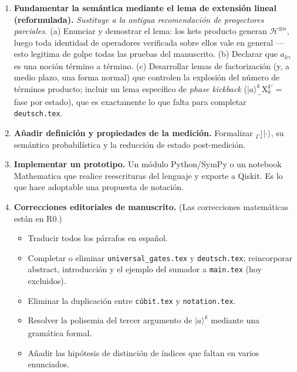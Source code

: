 \documentclass[12pt, a4paper]{article}
\newcommand{\gate}[1]{\text{#1}}
\newcommand{\stateket}[3]{\ket{#1}^{#2}_{#3}}
\newcommand{\stategate}[3]{\gate{#1}^{#2}_{#3}}
\newcommand{\ket}[1]{|#1\rangle}
\begin{document}
\begin{enumerate}[label=\textbf{R\arabic*.}, start=0]
  \item \textbf{Fundamentar la semántica mediante el lema de extensión
          lineal (reformulada).}
        \emph{Sustituye a la antigua recomendación de proyectores parciales.}
        (a) Enunciar y demostrar el lema: los kets producto generan
        $\mathcal{H}^{\otimes n}$, luego toda identidad de operadores
        verificada sobre ellos vale en general --- esto legitima de golpe
        todas las pruebas del manuscrito.
        (b) Declarar que $a_{k\gamma}$ es una noción término a término.
        (c) Desarrollar lemas de factorización (y, a medio plazo, una forma
        normal) que controlen la explosión del número de términos producto;
        incluir un lema específico de \emph{phase kickback}
        ($\stateket{a}{k}{-}\stategate{X}{k'}{k} = $ fase por estado), que es
        exactamente lo que falta para completar \texttt{deutsch.tex}.

  \item \textbf{Añadir definición y propiedades de la medición.}
        Formalizar $_{{\Gamma}}\rfloor\ket{\cdot}$, su semántica probabilística
        y la reducción de estado post-medición.

  \item \textbf{Implementar un prototipo.}
        Un módulo Python/SymPy o un notebook Mathematica que realice
        reescrituras del lenguaje y exporte a Qiskit. Es lo que hace adoptable
        una propuesta de notación.

  \item \textbf{Correcciones editoriales de manuscrito.}
        (Las correcciones matemáticas están en R0.)
        \begin{itemize}
          \item Traducir todos los párrafos en español.
          \item Completar o eliminar \texttt{universal\_gates.tex} y
                \texttt{deutsch.tex}; reincorporar abstract, introducción y
                el ejemplo del sumador a \texttt{main.tex} (hoy excluidos).
          \item Eliminar la duplicación entre \texttt{cúbit.tex} y
                \texttt{notation.tex}.
          \item Resolver la polisemia del tercer argumento de
                $\stateket{a}{k}{\cdot}$ mediante una gramática formal.
          \item Añadir las hipótesis de distinción de índices que faltan en
                varios enunciados.
        \end{itemize}
\end{enumerate}
\end{document}
